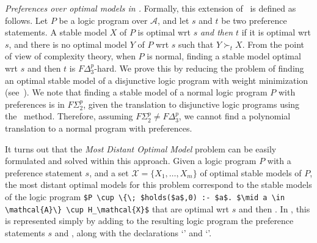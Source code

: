\emph{Preferences over optimal models in \asprin.}
%
%
Formally, this extension of \asprin\ is defined as follows.
%
Let $P$ be a logic program over $\mathcal{A}$, 
and let $s$ and $t$ be two preference statements.
%
A stable model $X$ of $P$ is optimal wrt $s$ \emph{and then} $t$ if
it is optimal wrt $s$, 
and there is no optimal model $Y$ of $P$ wrt $s$ such that $Y \succ_t X$.
%
From the point of view of complexity theory, when $P$ is normal, 
finding a stable model optimal wrt $s$ and then $t$ is $F\Delta^p_3$-hard.
We prove this by reducing the problem of finding an optimal stable model of a 
disjunctive logic program with weight minimization (see~\cite{roscwa16b}). %
%
We note that finding a stable model of a normal logic program $P$ with preferences 
is in $F\Sigma^p_2$, given the translation to disjunctive logic programs using the \gc\ method.
%
Therefore, assuming $F\Sigma^p_2 \neq F\Delta^p_3$, 
we cannot find a polynomial translation to a normal program with preferences.

It turns out that the \emph{Most Distant Optimal Model} problem can be easily formulated and solved within this approach.
%
Given a logic program $P$ with a preference statement $s$, 
and a set $\mathcal{X}=\{ X_1, \ldots, X_m \}$ of optimal stable models of $P$, 
the most distant optimal models for this problem correspond to the stable models of the logic program
\lstinline[mathescape=true]!$P \cup \{\; $holds($a$,0) :- $a$. $\mid a \in \mathcal{A}\} \cup H_\mathcal{X}$!
that are optimal wrt $s$ and then .
%
In \asprin, this is represented simply by adding to the resulting logic program 
the preference statements $s$ and , 
along with the declarations `' and `'.

